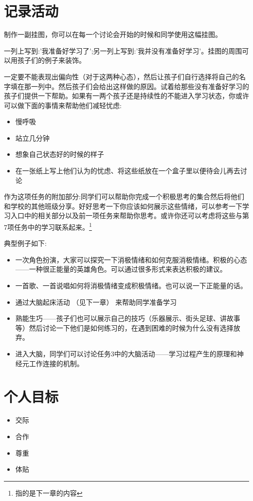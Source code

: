 \section{记录活动}
    制作一副挂图，你可以在每一个讨论会开始的时候和同学使用这幅挂图。\par
    一列上写到:'我准备好学习了';另一列上写到:'我并没有准备好学习'。挂图的周围可以用孩子们的例子来装饰。\par
    一定要不能表现出偏向性（对于这两种心态），然后让孩子们自行选择将自己的名字填在那一列中。然后孩子们会给出这样做的原因。试着给那些没有准备好学习的孩子们提供一下帮助。如果有一两个孩子还是持续性的不能进入学习状态，你或许可以做下面的事情来帮助他们减轻忧虑:\par
    \begin{itemize}
      \item 慢呼吸
      \item 站立几分钟
      \item 想象自己状态好的时候的样子 
      \item 在一张纸上写上他们认为的忧虑、将这些纸放在一个盒子里以便待会儿再去讨论  
    \end{itemize}  
    作为这项任务的附加部分:同学们可以帮助你完成一个积极思考的集合然后将他们和学校的其他班级分享。好好思考一下你应该如何展示这些情绪，可以参考一下学习入口中的相关部分以及前一项任务来帮助你思考。或许你还可以考虑将这些与第7项任务中的学习联系起来。\footnote{指的是下一章的内容}\par
    典型例子如下:\par
    \begin{itemize}
      \item 一次角色扮演，大家可以探究一下消极情绪和如何克服消极情绪。积极的心态——一种很正能量的英雄角色。可以通过很多形式来表达积极的建议。
      \item  一首歌、一首说唱如何将消极情绪变成积极情绪。也可以说一下正能量的话。
      \item  通过大脑起床活动 （见下一章） 来帮助同学准备学习
      \item  熟能生巧——孩子们也可以展示自己的技巧（乐器展示、街头足球、讲故事等）然后讨论一下他们是如何练习的，在遇到困难的时候为什么没有选择放弃。
      \item  进入大脑，同学们可以讨论任务3中的大脑活动——学习过程产生的原理和神经元工作连接的机制。
    \end{itemize}


\section{个人目标}
    \begin{itemize}
      \item 交际
      \item 合作
      \item 尊重
      \item 体贴  
    \end{itemize}  
